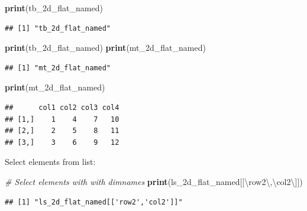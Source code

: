 \documentclass[
]{book}
\newenvironment{Shaded}{\begin{snugshade}}{\end{snugshade}}
\newcommand{\CharTok}[1]{\textcolor[rgb]{0.31,0.60,0.02}{#1}}
\newcommand{\CommentTok}[1]{\textcolor[rgb]{0.56,0.35,0.01}{\textit{#1}}}
\newcommand{\KeywordTok}[1]{\textcolor[rgb]{0.13,0.29,0.53}{\textbf{#1}}}
\newcommand{\NormalTok}[1]{#1}
\newcommand{\StringTok}[1]{\textcolor[rgb]{0.31,0.60,0.02}{#1}}
\begin{document}
\begin{Shaded}
\begin{Highlighting}[]
\KeywordTok{print}\NormalTok{(}\StringTok{\textquotesingle{}tb\_2d\_flat\_named\textquotesingle{}}\NormalTok{)}
\end{Highlighting}
\end{Shaded}

\begin{verbatim}
## [1] "tb_2d_flat_named"
\end{verbatim}

\begin{Shaded}
\begin{Highlighting}[]
\KeywordTok{print}\NormalTok{(tb\_2d\_flat\_named)}
\KeywordTok{print}\NormalTok{(}\StringTok{\textquotesingle{}mt\_2d\_flat\_named\textquotesingle{}}\NormalTok{)}
\end{Highlighting}
\end{Shaded}

\begin{verbatim}
## [1] "mt_2d_flat_named"
\end{verbatim}

\begin{Shaded}
\begin{Highlighting}[]
\KeywordTok{print}\NormalTok{(mt\_2d\_flat\_named)}
\end{Highlighting}
\end{Shaded}

\begin{verbatim}
##      col1 col2 col3 col4
## [1,]    1    4    7   10
## [2,]    2    5    8   11
## [3,]    3    6    9   12
\end{verbatim}

Select elements from list:

\begin{Shaded}
\begin{Highlighting}[]
\CommentTok{\# Select elements with with dimnames}
\KeywordTok{print}\NormalTok{(}\StringTok{\textquotesingle{}ls\_2d\_flat\_named[[}\CharTok{\textbackslash{}\textquotesingle{}}\StringTok{row2}\CharTok{\textbackslash{}\textquotesingle{}}\StringTok{,}\CharTok{\textbackslash{}\textquotesingle{}}\StringTok{col2}\CharTok{\textbackslash{}\textquotesingle{}}\StringTok{]]\textquotesingle{}}\NormalTok{)}
\end{Highlighting}
\end{Shaded}

\begin{verbatim}
## [1] "ls_2d_flat_named[['row2','col2']]"
\end{verbatim}
\end{document}
